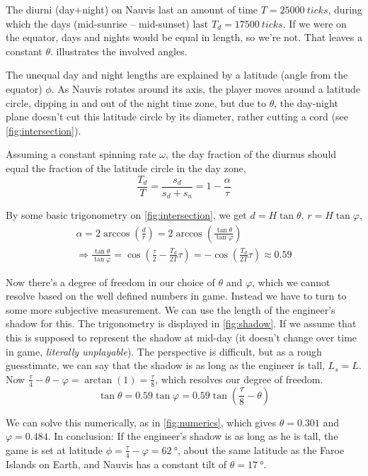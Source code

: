 \documentclass[a4paper]{article}
\begin{document}
The diurni (day+night) on Nauvis last an amount of time \(T=\SI{25000}{ticks}\), during which the days (mid-sunrise -- mid-sunset) last \(T_d=\SI{17500}{ticks}\). If we were on the equator, days and nights would be equal in length, so we're not. That leaves a constant \(\theta\).  illustrates the involved angles.

The unequal day and night lengths are explained by a latitude (angle from the equator) \(\phi\). As Nauvis rotates around its axis, the player moves around a latitude circle, dipping in and out of the night time zone, but due to \(\theta\), the day-night plane doesn't cut this latitude circle by its diameter, rather cutting a cord (see \cref{fig:intersection}).

Assuming a constant spinning rate \(\omega\), the day fraction of the diurnus should equal the fraction of the latitude circle in the day zone,
\[
	\frac{T_d}{T}=\frac{s_d}{s_d+s_n}=1-\frac{\alpha}{\tau}
\]

By some basic trigonometry on \cref{fig:intersection}, we get \(d=H\tan\theta\), \(r=H\tan\varphi\), 
\[
	\begin{gathered}
		\alpha=2\arccos\left(\frac{d}{r}\right)=2\arccos\left(\frac{\tan\theta}{\tan\varphi}\right) \\
		\Longrightarrow \frac{\tan\theta}{\tan\varphi}=\cos\left(\frac{\tau}{2}-\frac{T_d}{2T}\tau\right)=-\cos\left(\frac{T_d}{2T}\tau\right)\approx0.59
	\end{gathered}
\]

Now there's a degree of freedom in our choice of \(\theta\) and \(\varphi\), which we cannot resolve based on the well defined numbers in game. Instead we have to turn to some more subjective measurement. We can use the length of the engineer's shadow for this. The trigonometry is displayed in \cref{fig:shadow}. If we assume that this is supposed to represent the shadow at mid-day (it doesn't change over time in game, \emph{literally unplayable}). The perspective is difficult, but as a rough guesstimate, we can say that the shadow is as long as the engineer is tall, \(L_s=L\). Now \(\frac{\tau}{4}-\theta-\varphi=\arctan(1)=\frac{\tau}{8}\), which resolves our degree of freedom.
\[
	\tan\theta=0.59\tan\varphi=0.59\tan\left(\frac{\tau}{8}-\theta\right)
\]

We can solve this numerically, as in \cref{fig:numerics}, which gives \(\theta=0.301\) and \(\varphi=0.484\). In conclusion: If the engineer's shadow is as long as he is tall, the game is set at latitude \(\phi=\frac{\tau}{4}-\varphi=\SI{62}{\degree}\), about the same latitude as the Faroe Islands on Earth, and Nauvis has a constant tilt of \(\theta=\SI{17}{\degree}\).
\end{document}
